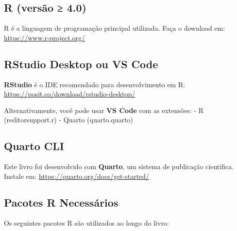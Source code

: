 \documentclass[
  letterpaper,
]{book}
\begin{document}
\subsection*{R (versão ≥ 4.0)}\label{r-versuxe3o-4.0}

R é a linguagem de programação principal utilizada. Faça o download em:
\url{https://www.r-project.org/}

\subsection*{RStudio Desktop ou VS
Code}\label{rstudio-desktop-ou-vs-code}

\textbf{RStudio} é o IDE recomendado para desenvolvimento em R:
\url{https://posit.co/download/rstudio-desktop/}

Alternativamente, você pode usar \textbf{VS Code} com as extensões: - R
(reditorsupport.r) - Quarto (quarto.quarto)

\subsection*{Quarto CLI}\label{quarto-cli}

Este livro foi desenvolvido com \textbf{Quarto}, um sistema de
publicação científica. Instale em:
\url{https://quarto.org/docs/get-started/}

\subsection*{Pacotes R Necessários}\label{pacotes-r-necessuxe1rios}

Os seguintes pacotes R são utilizados ao longo do livro:
\end{document}
